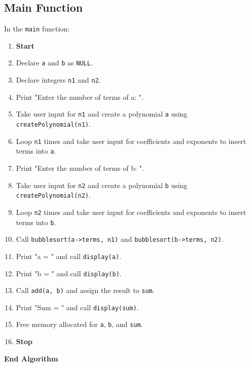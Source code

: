 {  \subsection{Main Function}
  In the \texttt{main} function:
  \begin{enumerate}[label=\arabic*:, start=1]
    \item \textbf{Start}
    \item Declare \texttt{a} and \texttt{b} as \texttt{NULL}.
    \item Declare integers \texttt{n1} and \texttt{n2}.
    \item Print "Enter the number of terms of a: ".
    \item Take user input for \texttt{n1} and create a polynomial \texttt{a} using \texttt{createPolynomial(n1)}.
    \item Loop \texttt{n1} times and take user input for coefficients and exponents to insert terms into \texttt{a}.
    \item Print "Enter the number of terms of b: ".
    \item Take user input for \texttt{n2} and create a polynomial \texttt{b} using \texttt{createPolynomial(n2)}.
    \item Loop \texttt{n2} times and take user input for coefficients and exponents to insert terms into \texttt{b}.
    \item Call \texttt{bubblesort(a->terms, n1)} and \texttt{bubblesort(b->terms, n2)}.
    \item Print "a = " and call \texttt{display(a)}.
    \item Print "b = " and call \texttt{display(b)}.
    \item Call \texttt{add(a, b)} and assign the result to \texttt{sum}.
    \item Print "Sum = " and call \texttt{display(sum)}.
    \item Free memory allocated for \texttt{a}, \texttt{b}, and \texttt{sum}.
    \item \textbf{Stop}
  \end{enumerate}
  \textbf{End Algorithm}
 }

